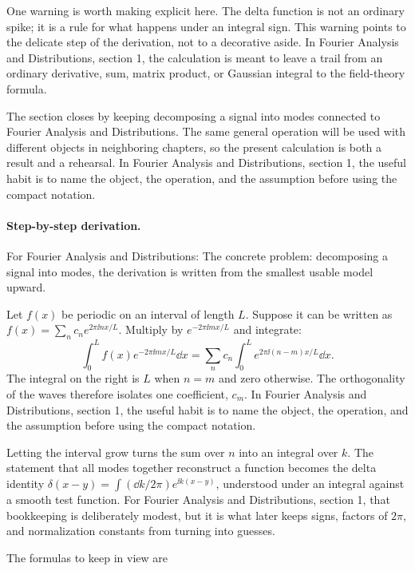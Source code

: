 One warning is worth making explicit here.  The delta function is not an ordinary spike; it is a rule for what happens under an integral sign.  This warning points to the delicate step of the derivation, not to a decorative aside.  In Fourier Analysis and Distributions, section 1, the calculation is meant to leave a trail from an ordinary derivative, sum, matrix product, or Gaussian integral to the field-theory formula.

The section closes by keeping decomposing a signal into modes connected to Fourier Analysis and Distributions.  The same general operation will be used with different objects in neighboring chapters, so the present calculation is both a result and a rehearsal.  In Fourier Analysis and Distributions, section 1, the useful habit is to name the object, the operation, and the assumption before using the compact notation.



\paragraph{Step-by-step derivation.}

For Fourier Analysis and Distributions: The concrete problem: decomposing a signal into modes, the derivation is written from the smallest usable model upward.

Let \(f(x)\) be periodic on an interval of length \(L\).  Suppose it can be written as \(f(x)=\sum_n c_ne^{2\pi\ii nx/L}\).  Multiply by \(e^{-2\pi\ii mx/L}\) and integrate:
\[
  \int_0^L f(x)e^{-2\pi\ii mx/L}\dd x
  =
  \sum_n c_n\int_0^L e^{2\pi\ii(n-m)x/L}\dd x.
\]
The integral on the right is \(L\) when \(n=m\) and zero otherwise.  The orthogonality of the waves therefore isolates one coefficient, \(c_m\).  In Fourier Analysis and Distributions, section 1, the useful habit is to name the object, the operation, and the assumption before using the compact notation.

Letting the interval grow turns the sum over \(n\) into an integral over \(k\).  The statement that all modes together reconstruct a function becomes the delta identity \(\delta(x-y)=\int(\dd k/2\pi)e^{\ii k(x-y)}\), understood under an integral against a smooth test function.  For Fourier Analysis and Distributions, section 1, that bookkeeping is deliberately modest, but it is what later keeps signs, factors of \(2\pi\), and normalization constants from turning into guesses.

The formulas to keep in view are

